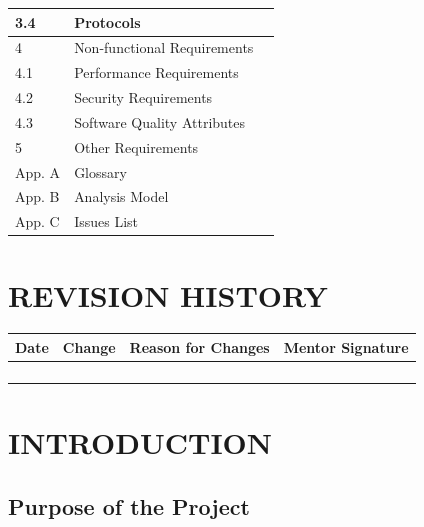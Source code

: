 \documentclass[12pt,a4paper]{article}
\begin{document}
\begin{longtable}{|p{1.5cm}|p{8.5cm}|p{3cm}|}
    \hline
    3.4 & Protocols & \pageref{sec:protocols} \\
    \hline
    4 & Non-functional Requirements & \pageref{sec:nonfunc} \\
    \hline
    4.1 & Performance Requirements & \pageref{sec:performance} \\
    \hline
    4.2 & Security Requirements & \pageref{sec:security} \\
    \hline
    4.3 & Software Quality Attributes & \pageref{sec:quality} \\
    \hline
    5 & Other Requirements & \pageref{sec:other} \\
    \hline
    App. A & Glossary & \pageref{app:glossary} \\
    \hline
    App. B & Analysis Model & \pageref{app:analysis} \\
    \hline
    App. C & Issues List & \pageref{app:issues} \\
    \hline
\end{longtable}

\label{toc}
\newpage

\section*{REVISION HISTORY}
\label{revision}

\begin{longtable}{|p{2.5cm}|p{3.5cm}|p{5cm}|p{2.5cm}|}
    \hline
    \textbf{Date} & \textbf{Change} & \textbf{Reason for Changes} & \textbf{Mentor Signature} \\
    \hline
    & & & \\
    \hline
    & & & \\
    \hline
    & & & \\
    \hline
    & & & \\
    \hline
\end{longtable}

\newpage

\section{INTRODUCTION}
\label{sec:intro}

\subsection{Purpose of the Project}
\label{sec:purpose}
\end{document}
